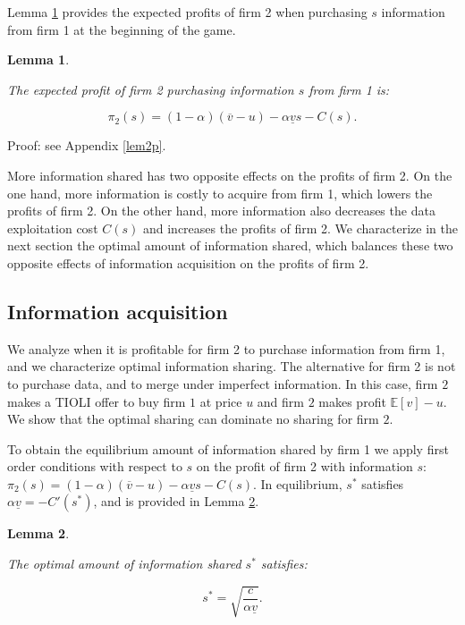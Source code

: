 \documentclass[a4paper,leqno]{article}%
\newtheorem{lemma}{Lemma}
\newcommand{\E}{\mathbb E}
\renewcommand{\a}{\alpha}
\newcommand{\uv}{\underline{v}}
\newcommand{\ov}{\overline{v}}
\begin{document}
\medskip

Lemma \ref{lem2} provides the expected profits of firm 2 when purchasing $s$ information from firm 1 at the beginning of the game. 

\begin{lemma}~~\label{lem2}

The expected profit of firm 2 purchasing information $s$ from firm 1 is:

    $$\pi_2(s)=(1-\a)(\ov -u)-\a \uv s-C(s).$$ 

\end{lemma}

\noindent Proof: see Appendix \ref{lem2p}.

\noindent More information shared has two opposite effects on the profits of firm 2. On the one hand, more information is costly to acquire from firm 1, which lowers the profits of firm 2. On the other hand, more information also decreases the data exploitation cost $C(s)$ and increases the profits of firm 2. We characterize in the next section the optimal amount of information shared, which balances these two opposite effects of information acquisition on the profits of firm 2.


\medskip

\subsection{Information acquisition}\label{infacq}

We analyze when it is profitable for firm 2 to purchase information from firm 1, and we characterize optimal information sharing. The alternative for firm 2 is not to purchase data, and to merge under imperfect information. In this case, firm $2$ makes a TIOLI offer to buy firm $1$ at price $u$ and firm $2$ makes profit $\E[v]-u$. We show that the optimal sharing can dominate no sharing for firm $2$. 

\medskip

To obtain the equilibrium amount of information shared by firm 1 we apply first order conditions with respect to $s$ on the profit of firm 2 with information $s$: $\pi_2(s)=(1-\a)(\ov -u)-\a \uv s-C(s)$. In equilibrium, $s^*$ satisfies $\a \uv =-C'(s^*)$, and is provided in Lemma \ref{lem0}.


\begin{lemma}~~\label{lem0}

The optimal amount of information shared $s^*$ satisfies:

$$s^*=\sqrt{\frac{c}{\a \uv}}.$$

\end{lemma}
\end{document}
